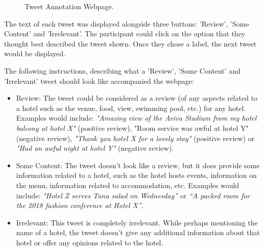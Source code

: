 \begin{figure}[h!]
\centering
{}
\caption{\label{fig:webpage} Tweet Annotation Webpage.}
\end{figure}

The text of each tweet was displayed alongside three buttons: 'Review', 'Some Content' and 'Irrelevant'. The participant could click on the option that they thought best described the tweet shown. Once they chose a label, the next tweet would be displayed. 

The following instructions, describing what a 'Review', 'Some Content' and 'Irrelevant' tweet should look like accompanied the webpage:
\begin{itemize}
    \item Review: The tweet could be considered as a review (of any aspects related to a hotel such as the venue, food, view, swimming pool, etc.) for any hotel. Examples would include: \emph{"Amazing view of the Aviva Stadium from my hotel balcony at hotel X"} (positive review), "Room service was awful at hotel Y" (negative review), \emph{"Thank you hotel X for a lovely stay"} (positive review) or \emph{"Had an awful night at hotel Y"} (negative review).
    \item Some Content: The tweet doesn't look like a review, but it does provide some information related to a hotel, such as the hotel hosts events, information on the menu, information related to accommodation, etc. Examples would include: \emph{"Hotel Z serves Tuna salad on Wednesday”} or \emph{“A packed room for the 2018 fashion conference at Hotel X”}.
    \item Irrelevant: This tweet is completely irrelevant. While perhaps mentioning the name of a hotel, the tweet doesn't give any additional information about that hotel or offer any opinions related to the hotel.
\end{itemize}

